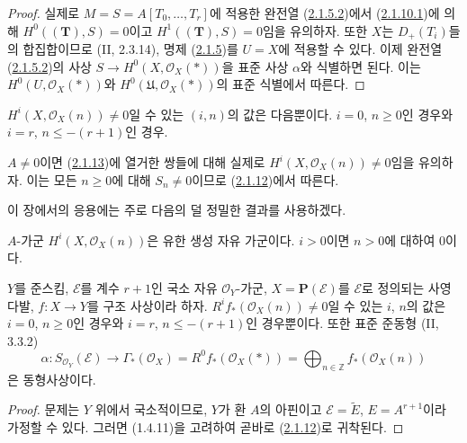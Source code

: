 \begin{proof}
실제로 $M=S=A[T_0,\ldots,T_r]$에 적용한 완전열
(\hyperref[III.2.1.5.2-fr]{2.1.5.2})에서
(\hyperref[III.2.1.10.1-fr]{2.1.10.1})에 의해
$H^0((\mathbf T),S)=0$이고 $H^1((\mathbf T),S)=0$임을 유의하자.
또한 $X$는 $D_+(T_i)$들의 합집합이므로 (II, 2.3.14), 명제
(\hyperref[III.2.1.5-fr]{2.1.5})를 $U=X$에 적용할 수 있다. 이제 완전열
(\hyperref[III.2.1.5.2-fr]{2.1.5.2})의 사상
$S\to H^0(X,\mathcal O_X(*))$을 표준 사상 $\alpha$와 식별하면 된다.
이는 $H^0(U,\mathcal O_X(*))$와
$H^0(\mathfrak U,\mathcal O_X(*))$의 표준 식별에서 따른다.
\end{proof}

\begin{corollary}[2.1.13]
\label{III.2.1.13-fr}
$H^i(X,\mathcal O_X(n))\neq0$일 수 있는 $(i,n)$의 값은 다음뿐이다.
$i=0$, $n\geq0$인 경우와 $i=r$, $n\leq-(r+1)$인 경우.
\end{corollary}

$A\neq0$이면 (\hyperref[III.2.1.13-fr]{2.1.13})에 열거한 쌍들에 대해
실제로 $H^i(X,\mathcal O_X(n))\neq0$임을 유의하자. 이는 모든
$n\geq0$에 대해 $S_n\neq0$이므로
(\hyperref[III.2.1.12-fr]{2.1.12})에서 따른다.

이 장에서의 응용에는 주로 다음의 덜 정밀한 결과를 사용하겠다.

\begin{corollary}[2.1.14]
\label{III.2.1.14-fr}
$A$-가군 $H^i(X,\mathcal O_X(n))$은 유한 생성 자유 가군이다. $i>0$이면
$n>0$에 대하여 0이다.
\end{corollary}

\begin{proposition}[2.1.15]
\label{III.2.1.15-fr}
$Y$를 준스킴, $\mathcal E$를 계수 $r+1$인 국소 자유
$\mathcal O_Y$-가군, $X=\mathbf P(\mathcal E)$를 $\mathcal E$로 정의되는
사영 다발, $f:X\to Y$를 구조 사상이라 하자.
$R^if_*(\mathcal O_X(n))\neq0$일 수 있는 $i$, $n$의 값은 $i=0$,
$n\geq0$인 경우와 $i=r$, $n\leq-(r+1)$인 경우뿐이다. 또한 표준
준동형 (II, 3.3.2)
\[
\alpha:S_{\mathcal O_Y}(\mathcal E)
\longrightarrow\Gamma_*(\mathcal O_X)
=R^0f_*(\mathcal O_X(*))
=\bigoplus_{n\in\mathbb Z}f_*(\mathcal O_X(n))
\]
은 동형사상이다.
\end{proposition}

\begin{proof}
문제는 $Y$ 위에서 국소적이므로, $Y$가 환 $A$의 아핀이고
$\mathcal E=\widetilde E$, $E=A^{r+1}$이라 가정할 수 있다. 그러면
(1.4.11)을 고려하여 곧바로 (\hyperref[III.2.1.12-fr]{2.1.12})로
귀착된다.
\end{proof}

